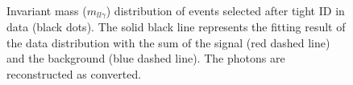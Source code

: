 \begin{figure}[htbp]
    \centering
	 \\
	\begin{tcolorbox}[colback=black!5!white,colframe=white!75!black]
    \caption{Invariant mass ($m_{ll\gamma}$) distribution of events selected after tight ID in data (black dots). The solid black line represents the fitting result of the data distribution with the sum of the signal (red dashed line) and the background (blue dashed line). The photons are reconstructed as converted.}
    \label{Eff:TemplateFit:C:After}
    \end{tcolorbox}
    
\end{figure}

